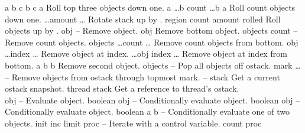 \begin{longtable}{}
\hline
\optableent
	{a b c}
	{{\bf {}}}
	{b c a}
	{Roll top three objects down one.}
\hline
\optableent
	{a \dots b count}
	{{\bf {}}}
	{\dots b a}
	{Roll count objects down one.}
\hline
\optableent
	{\dots amount}
	{{\bf {}}}
	{\dots}
	{Rotate stack up by .}
\hline
\optableent
	{region count amount}
	{{\bf {}}}
	{rolled}
	{Roll  objects up by .}
\hline
\optableent
	{obj}
	{{\bf {}}}
	{--}
	{Remove object.}
\hline
\optableent
	{obj \commas}
	{{\bf {}}}
	{\commas}
	{Remove bottom object.}
\hline
\optableent
	{objects count}
	{{\bf {}}}
	{--}
	{Remove count objects.}
\hline
\optableent
	{objects \dots count}
	{{\bf {}}}
	{\dots}
	{Remove count objects from bottom.}
\hline
\optableent
	{obj \dots index}
	{{\bf {}}}
	{\dots}
	{Remove object at index.}
\hline
\optableent
	{\dots obj \commas index}
	{{\bf {}}}
	{\dots \commas}
	{Remove object at index from bottom.}
\hline
\optableent
	{a b}
	{{\bf {}}}
	{b}
	{Remove second object.}
\hline
\optableent
	{objects}
	{{\bf {}}}
	{--}
	{Pop all objects off ostack.}
\hline
\optableent
	{mark \dots}
	{{\bf {}}}
	{--}
	{Remove objects from ostack through topmost mark.}
\hline
\optableent
	{--}
	{{\bf {}}}
	{stack}
	{Get a current ostack snapshot.}
\hline
\optableent
	{thread}
	{{\bf {}}}
	{stack}
	{Get a reference to thread's ostack.}
\hline \hline
{} \\
\hline \hline
\optableent
	{obj}
	{{\bf {}}}
	{--}
	{Evaluate object.}
\hline
\optableent
	{boolean obj}
	{{\bf {}}}
	{--}
	{Conditionally evaluate object.}
\hline
\optableent
	{boolean obj}
	{{\bf {}}}
	{--}
	{Conditionally evaluate object.}
\hline
\optableent
	{boolean a b}
	{{\bf {}}}
	{--}
	{Conditionally evaluate one of two objects.}
\hline
\optableent
	{init inc limit proc}
	{{\bf {}}}
	{--}
	{Iterate with a control variable.}
\hline
\optableent
	{count proc}
	{{\bf {}}}

\end{longtable}
